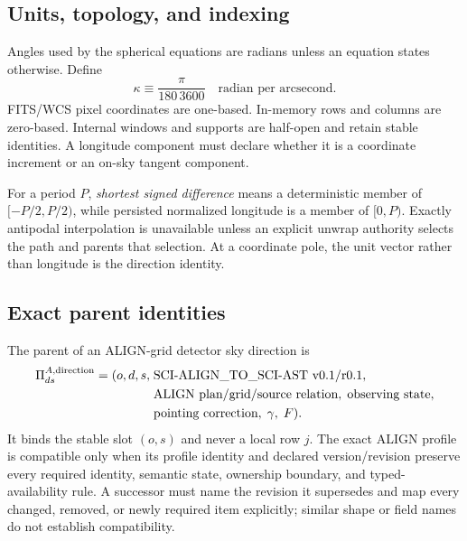 \subsection{Units, topology, and indexing}

Angles used by the spherical equations are radians unless an equation states
otherwise.  Define
\begin{equation}
  \kappa \equiv \frac{\pi}{180\,3600}
  \quad\text{radian per arcsecond}.
  \label{eq:kappa}
\end{equation}
FITS/WCS pixel coordinates are one-based.  In-memory rows and columns are
zero-based.  Internal windows and supports are half-open and retain stable
identities.  A longitude component must declare whether it is a coordinate
increment or an on-sky tangent component.

For a period $P$, \emph{shortest signed difference} means a deterministic
member of $[-P/2,P/2)$, while persisted normalized longitude is a member of
$[0,P)$.  Exactly antipodal interpolation is unavailable unless an explicit
unwrap authority selects the path and parents that selection.  At a
coordinate pole, the unit vector rather than longitude is the direction
identity.

\subsection{Exact parent identities}

The parent of an ALIGN-grid detector sky direction is
\begin{equation}
 \begin{aligned}
 \Pi^{A,{\rm direction}}_{ds}=(o,d,s,\;&
  \text{SCI-ALIGN\_TO\_SCI-AST v0.1/r0.1},\\
  &\text{ALIGN plan/grid/source relation},\;\text{observing state},\\
  &\text{pointing correction},\;\gamma,\;F).
 \end{aligned}
 \label{eq:align-parent}
\end{equation}
It binds the stable slot $(o,s)$ and never a local row $j$.  The exact ALIGN
profile is compatible only when its profile identity and declared
version/revision preserve every required identity, semantic state, ownership
boundary, and typed-availability rule.  A successor must name the revision it
supersedes and map every changed, removed, or newly required item explicitly;
similar shape or field names do not establish compatibility.

